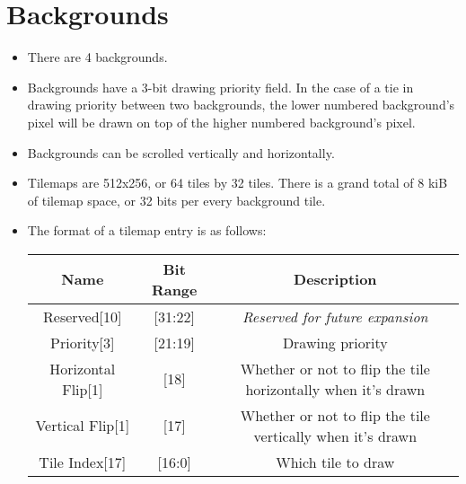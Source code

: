 \documentclass{article}
\begin{document}
\section{Backgrounds}
	\begin{itemize}
	\item There are 4 backgrounds.

	\item Backgrounds have a 3-bit drawing priority field.  In the case of
	a tie in drawing priority between two backgrounds, the lower numbered
	background's pixel will be drawn on top of the higher numbered
	background's pixel.

	\item Backgrounds can be scrolled vertically and horizontally.

	\item Tilemaps are 512x256, or 64 tiles by 32 tiles.  There is a grand
	total of 8 kiB of tilemap space, or 32 bits per every background tile.

	\item The format of a tilemap entry is as follows:
		\begin{table}[H]
			\begin{center}
				\begin{tabular}{|c|c|c|}
					\hline
					\textbf{Name} & \textbf{Bit Range}
						& \textbf{Description}\\
					\hline
					Reserved[10] & [31:22]
						& \textit{Reserved for future expansion}\\
					Priority[3] & [21:19]
						& Drawing priority\\
					Horizontal Flip[1] & [18]
						& Whether or not to flip the tile horizontally
						when it's drawn\\
					Vertical Flip[1] & [17]
						& Whether or not to flip the tile vertically
						when it's drawn\\
					Tile Index[17] & [16:0]
						& Which tile to draw\\
					\hline
				\end{tabular}
			\end{center}
		\end{table}
	\end{itemize}
	\newpage
\end{document}
